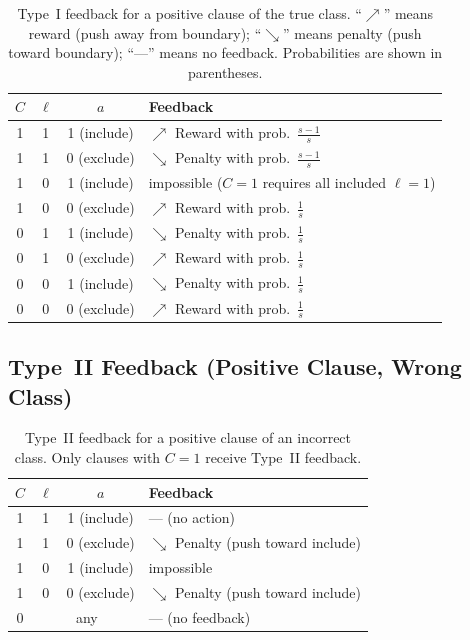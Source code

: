 \begin{table}[htbp]
\centering
\caption{Type~I feedback for a positive clause of the true class.
  ``$\nearrow$'' means reward (push away from boundary);
  ``$\searrow$'' means penalty (push toward boundary);
  ``---'' means no feedback. Probabilities are shown in parentheses.}
\label{tab:type1-pos}
\begin{tabular}{@{}ccc|l@{}}
  \toprule
  $C$ & $\ell$ & $a$ & Feedback \\
  \midrule
  1 & 1 & 1 (include) & $\nearrow$ Reward with prob.\ $\frac{s-1}{s}$ \\
  1 & 1 & 0 (exclude) & $\searrow$ Penalty with prob.\ $\frac{s-1}{s}$ \\
  1 & 0 & 1 (include) & impossible ($C = 1$ requires all included $\ell = 1$) \\
  1 & 0 & 0 (exclude) & $\nearrow$ Reward with prob.\ $\frac{1}{s}$ \\
  \midrule
  0 & 1 & 1 (include) & $\searrow$ Penalty with prob.\ $\frac{1}{s}$ \\
  0 & 1 & 0 (exclude) & $\nearrow$ Reward with prob.\ $\frac{1}{s}$ \\
  0 & 0 & 1 (include) & $\searrow$ Penalty with prob.\ $\frac{1}{s}$ \\
  0 & 0 & 0 (exclude) & $\nearrow$ Reward with prob.\ $\frac{1}{s}$ \\
  \bottomrule
\end{tabular}
\end{table}

\subsection{Type~II Feedback (Positive Clause, Wrong Class)}

\begin{table}[htbp]
\centering
\caption{Type~II feedback for a positive clause of an incorrect class.
  Only clauses with $C = 1$ receive Type~II feedback.}
\label{tab:type2-pos}
\begin{tabular}{@{}ccc|l@{}}
  \toprule
  $C$ & $\ell$ & $a$ & Feedback \\
  \midrule
  1 & 1 & 1 (include) & --- (no action) \\
  1 & 1 & 0 (exclude) & $\searrow$ Penalty (push toward include) \\
  1 & 0 & 1 (include) & impossible \\
  1 & 0 & 0 (exclude) & $\searrow$ Penalty (push toward include) \\
  \midrule
  0 & \multicolumn{2}{c|}{any} & --- (no feedback) \\
  \bottomrule
\end{tabular}
\end{table}

